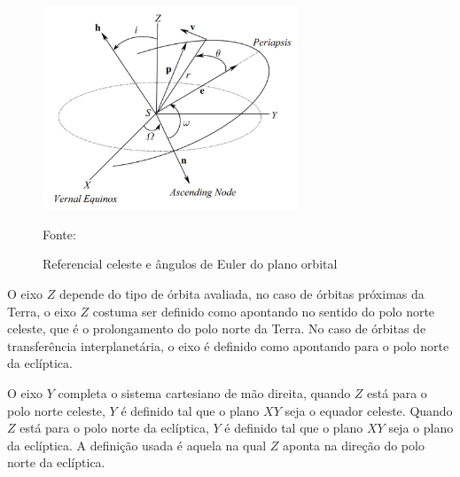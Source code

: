 \begin{figure}[h]
        \centering
        \includegraphics[width=3in]{figuras/celeste.png}
        \caption{Referencial celeste e ângulos de Euler do plano orbital}
        \footnotesize Fonte: \cite{livro:andre}
        \label{fig:CELESTE}
\end{figure} 


O eixo $Z$ depende do tipo de órbita avaliada, no caso de órbitas próximas da Terra, o eixo $Z$ costuma ser definido como apontando no sentido do polo norte celeste, que é o prolongamento do polo norte da Terra. No caso de órbitas de transferência interplanetária, o eixo é definido como apontando para o polo norte da eclíptica. 

O eixo $Y$ completa o sistema cartesiano de mão direita, quando $Z$ está para o polo norte celeste, $Y$ é definido tal que o plano $XY$ seja o equador celeste. Quando $Z$ está para o polo norte da eclíptica, $Y$ é definido tal que o plano $XY$ seja o plano da eclíptica. A definição usada é aquela na qual $Z$ aponta na direção do polo norte da eclíptica. 

